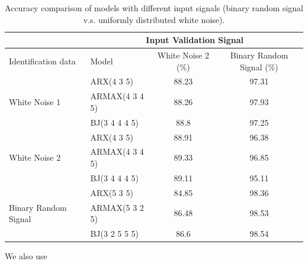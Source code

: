 \documentclass[10pt,a4paper]{article}
\begin{document}
	\begin{table}[ht]
		\footnotesize
		\centering
		\caption{Accuracy comparison of models with different input signals (binary random signal v.s. uniformly distributed white noise).}
		\label{table:accuracyComparison}
		\begin{tabular}{|l|l|c|c|}
		\hline
		& \multicolumn{3}{c|}{Input Validation Signal} \\
		\hline
		Identification data	& Model & White Noise 2 (\%) & Binary Random Signal (\%) \\
		\hline
		\multirow{3}{*}{White Noise 1} & ARX(4 3 5) & 88.23 & 97.31 \\
		& ARMAX(4 3 4 5) & 88.26 & 97.93 \\
		& BJ(3 4 4 4 5) & 88.8 & 97.25 \\
		\hline
		\multirow{3}{*}{White Noise 2} & ARX(4 3 5) & 88.91 & 96.38 \\
		& ARMAX(4 3 4 5) & 89.33 & 96.85 \\
		& BJ(3 4 4 4 5) & 89.11 & 95.11 \\
		\hline
		\multirow{3}{*}{Binary Random Signal} & ARX(5 3 5) & 84.85 & 98.36 \\
		& ARMAX(5 3 2 5) & 86.48 & 98.53 \\
		& BJ(3 2 5 5 5) & 86.6 & 98.54 \\
		\hline
		\end{tabular}
	\end{table}
\par We also use 
\end{document}
